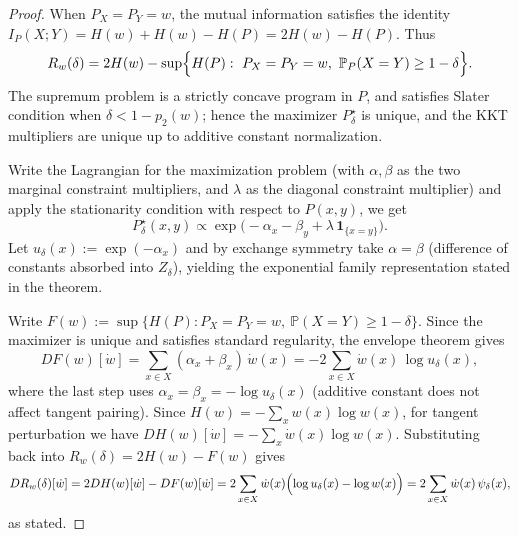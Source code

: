 \begin{proof}
When \(P_X=P_Y=w\), the mutual information satisfies the identity
\(
I_P(X;Y)=H(w)+H(w)-H(P)
=2H(w)-H(P)
\).
Thus
\[
R_w(\delta)
=2H(w)-\sup\Bigl\{H(P):\ P_X=P_Y=w,\ \mathbb P_P(X=Y)\ge 1-\delta\Bigr\}.
\]
The supremum problem is a strictly concave program in \(P\), and satisfies Slater condition when \(\delta<1-p_2(w)\); hence the maximizer \(P^\star_\delta\) is unique, and the KKT multipliers are unique up to additive constant normalization.
\par
Write the Lagrangian for the maximization problem (with \(\alpha,\beta\) as the two marginal constraint multipliers, and \(\lambda\) as the diagonal constraint multiplier) and apply the stationarity condition with respect to \(P(x,y)\), we get
\[
P^\star_\delta(x,y)\propto \exp\!\bigl(-\alpha_x-\beta_y+\lambda\,\mathbf 1_{\{x=y\}}\bigr).
\]
Let \(u_\delta(x):=\exp(-\alpha_x)\) and by exchange symmetry take \(\alpha=\beta\) (difference of constants absorbed into \(Z_\delta\)), yielding the exponential family representation stated in the theorem.
\par
Write
\(
F(w):=\sup\{H(P):P_X=P_Y=w,\ \mathbb P(X=Y)\ge 1-\delta\}
\).
Since the maximizer is unique and satisfies standard regularity, the envelope theorem gives
\[
DF(w)[\dot w]=\sum_{x\in X}(\alpha_x+\beta_x)\,\dot w(x)
=-2\sum_{x\in X}\dot w(x)\,\log u_\delta(x),
\]
where the last step uses \(\alpha_x=\beta_x=-\log u_\delta(x)\) (additive constant does not affect tangent pairing).
Since \(H(w)=-\sum_x w(x)\log w(x)\), for tangent perturbation we have \(DH(w)[\dot w]=-\sum_x\dot w(x)\log w(x)\).
Substituting back into \(R_w(\delta)=2H(w)-F(w)\) gives
\[
DR_w(\delta)[\dot w]
=2DH(w)[\dot w]-DF(w)[\dot w]
=2\sum_{x\in X}\dot w(x)\Bigl(\log u_\delta(x)-\log w(x)\Bigr)
=2\sum_{x\in X}\dot w(x)\,\psi_\delta(x),
\]
as stated.
\end{proof}

